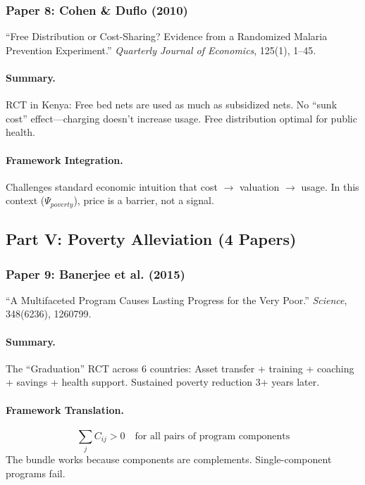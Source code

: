 \documentclass[12pt,a4paper]{article}
\begin{document}
\subsubsection{Paper 8: Cohen \& Duflo (2010)}

``Free Distribution or Cost-Sharing? Evidence from a Randomized Malaria Prevention Experiment.''
\textit{Quarterly Journal of Economics}, 125(1), 1--45.

\paragraph{Summary.}
RCT in Kenya: Free bed nets are used as much as subsidized nets. No ``sunk cost''
effect---charging doesn't increase usage. Free distribution optimal for public health.

\paragraph{Framework Integration.}
Challenges standard economic intuition that cost $\rightarrow$ valuation $\rightarrow$ usage.
In this context ($\Psi_{poverty}$), price is a barrier, not a signal.

\subsection{Part V: Poverty Alleviation (4 Papers)}

\subsubsection{Paper 9: Banerjee et al. (2015)}

``A Multifaceted Program Causes Lasting Progress for the Very Poor.''
\textit{Science}, 348(6236), 1260799.

\paragraph{Summary.}
The ``Graduation'' RCT across 6 countries: Asset transfer + training + coaching +
savings + health support. Sustained poverty reduction 3+ years later.

\paragraph{Framework Translation.}
\begin{equation}
  \sum_j C_{ij} > 0 \quad \text{for all pairs of program components}
\end{equation}
The bundle works because components are complements. Single-component programs fail.
\end{document}
